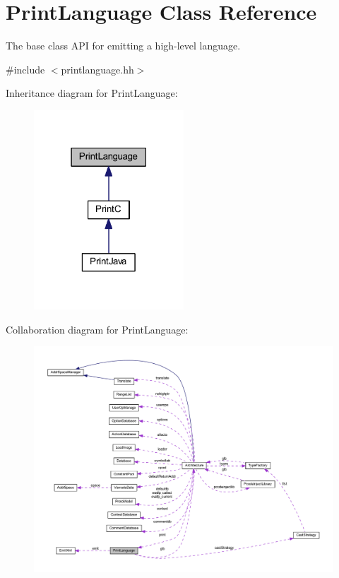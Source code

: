 \hypertarget{class_print_language}{}\section{Print\+Language Class Reference}
\label{class_print_language}


The base class A\+PI for emitting a high-\/level language.  




{\ttfamily \#include $<$printlanguage.\+hh$>$}



Inheritance diagram for Print\+Language\+:
\nopagebreak
\begin{figure}[H]
\begin{center}
\leavevmode
\includegraphics[width=159pt]{class_print_language__inherit__graph}
\end{center}
\end{figure}


Collaboration diagram for Print\+Language\+:
\nopagebreak
\begin{figure}[H]
\begin{center}
\leavevmode
\includegraphics[width=350pt]{class_print_language__coll__graph}
\end{center}
\end{figure}
